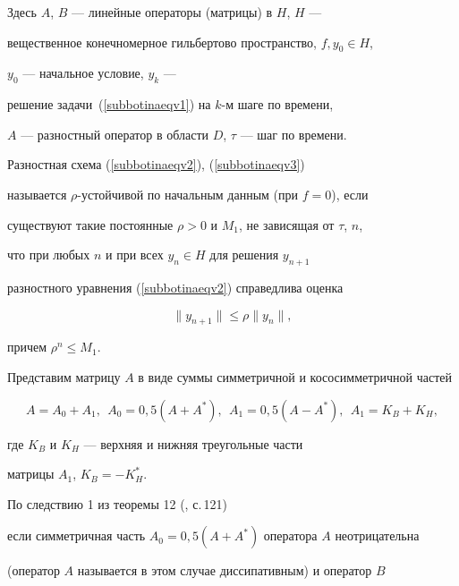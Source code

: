 Здесь $A$, $B$ --- линейные операторы (матрицы) в $H$, $H$ ---


вещественное конечномерное гильбертово пространство, $f,y_0 \in H$,


$y_0$ --- начальное условие, $y_k$ ---


решение задачи~(\ref{subbotinaeqv1}) на $k$-м шаге по времени,


$A$ --- разностный оператор в области $D$, $\tau$ --- шаг по времени.





\begin{defnnonum}


Разностная схема (\ref{subbotinaeqv2}), (\ref{subbotinaeqv3}) 


называется $\rho$-устойчивой по начальным данным (при $f=0$), если 


существуют такие постоянные $\rho>0$ и $M_1$, не зависящая от $\tau$, $n$,


что при любых $n$ и при всех $y_n \in H$ для решения $y_{n+1}$ 


разностного уравнения (\ref{subbotinaeqv2}) справедлива оценка


$$


\| {y_{n+1} }\| \le \rho \| {y_n } \|,


$$


причем $\rho^n \le M_1$.


\end{defnnonum}





Представим матрицу $A$ в виде суммы симметричной и кососимметричной частей


$$


A=A_0+A_1, \ \ 


A_0=0{,}5\left({A+A^*} \right), \ \ 


A_1=0{,}5\left({A - A^*} \right), \ \ 


A_1=K_B+K_H,


$$


где $K_B$ и $K_H$ --- верхняя и нижняя треугольные части 


матрицы $A_1$, $K_B=- K_H^*$.


По следствию 1 из теоремы 12 (\cite{subbotinabib6}, с.\,121)


если симметричная часть $A_0=0{,}5(A+A^*)$ оператора $A$ неотрицательна


(оператор $A$ называется в этом случае диссипативным) и оператор $B$


